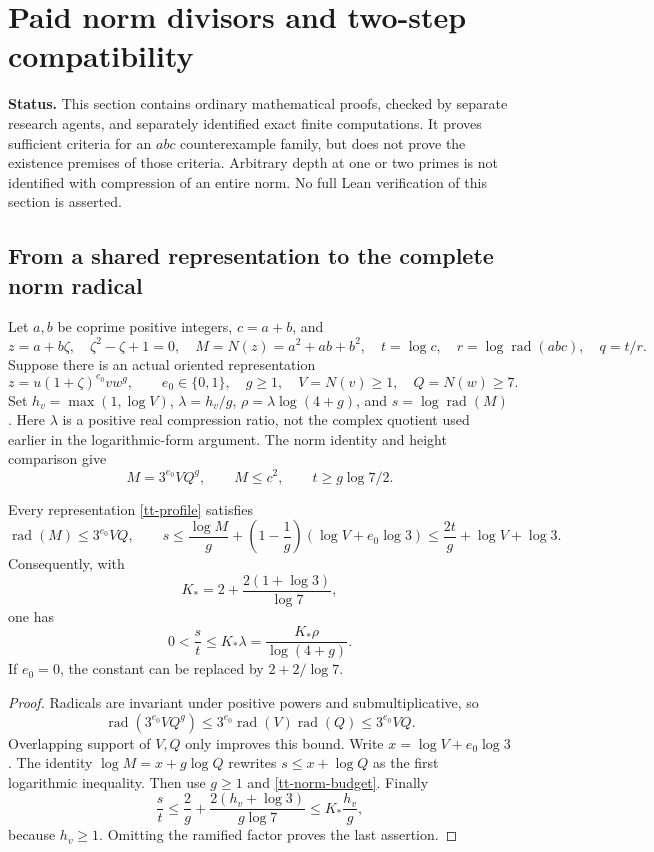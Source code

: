 \section{Paid norm divisors and two-step compatibility}
\label{tt-section}
\noindent\textbf{Status.} This section contains ordinary mathematical proofs,
checked by separate research agents, and separately identified exact finite
computations. It proves sufficient criteria for an $abc$ counterexample
family, but does not prove the existence premises of those criteria.
Arbitrary depth at one or two primes is not identified with compression of
an entire norm. No full Lean verification of this section is asserted.

\subsection{From a shared representation to the complete norm radical}
Let $a,b$ be coprime positive integers, $c=a+b$, and
\[
 z=a+b\zeta,\quad \zeta^2-\zeta+1=0,\quad
 M=N(z)=a^2+ab+b^2,\quad
 t=\log c,\quad r=\log\operatorname{rad}(abc),\quad q=t/r.
\]
Suppose there is an actual oriented representation
\begin{equation}\label{tt-profile}
 z=u(1+\zeta)^{e_0}v w^g,\qquad
 e_0\in\{0,1\},\quad g\ge1,\quad V=N(v)\ge1,\quad Q=N(w)\ge7.
\end{equation}
Set $h_v=\max(1,\log V)$, $\lambda=h_v/g$,
$\rho=\lambda\log(4+g)$, and $s=\log\operatorname{rad}(M)$.
Here $\lambda$ is a positive real compression ratio, not the complex
quotient used earlier in the logarithmic-form argument. The norm identity
and height comparison give
\begin{equation}\label{tt-norm-budget}
 M=3^{e_0}VQ^g,\qquad M\le c^2,\qquad t\ge g\log7/2.
\end{equation}

\begin{theorem}\label{tt-norm-radical}
Every representation \eqref{tt-profile} satisfies
\[
 \operatorname{rad}(M)\le3^{e_0}VQ,
 \qquad
 s\le\frac{\log M}{g}
   +\left(1-\frac1g\right)(\log V+e_0\log3)
 \le\frac{2t}{g}+\log V+\log3.
\]
Consequently, with
\[
 K_*=2+\frac{2(1+\log3)}{\log7},
\]
one has
\begin{equation}\label{tt-small-radical}
 0<\frac{s}{t}\le K_*\lambda
 =\frac{K_*\rho}{\log(4+g)}.
\end{equation}
If $e_0=0$, the constant can be replaced by $2+2/\log7$.
\end{theorem}
\begin{proof}
Radicals are invariant under positive powers and submultiplicative, so
\[
 \operatorname{rad}(3^{e_0}VQ^g)
 \le3^{e_0}\operatorname{rad}(V)\operatorname{rad}(Q)
 \le3^{e_0}VQ.
\]
Overlapping support of $V,Q$ only improves this bound. Write
$x=\log V+e_0\log3$. The identity $\log M=x+g\log Q$ rewrites
$s\le x+\log Q$ as the first logarithmic inequality. Then use $g\ge1$
and \eqref{tt-norm-budget}. Finally
\[
 \frac{s}{t}\le\frac2g+
 \frac{2(h_v+\log3)}{g\log7}
 \le K_*\frac{h_v}{g},
\]
because $h_v\ge1$. Omitting the ramified factor proves the last assertion.
\end{proof}

